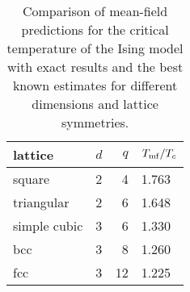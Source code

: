 \documentclass[prb,11pt]{revtex4-1}
\begin{document}
\begin{table}[h]
\centering
\begin{tabular}{|l|l|r|l|}
\hline
lattice & $d$ & $q$ & $T_{\rm mf}/T_c$ \\
\hline
square & 2 & 4 & 1.763 \\
\hline
triangular & 2 & 6 & 1.648 \\
\hline
simple cubic & 3 & 6 & 1.330 \\
\hline
bcc & 3 & 8 & 1.260 \\
\hline
fcc & 3 & 12 & 1.225 \\
\hline
\end{tabular}
\caption{\label{tab:5/tc}Comparison of mean-field predictions
for the critical temperature of the Ising model with exact results
and the best known estimates for different dimensions 
and lattice symmetries.}
\end{table}
\end{document}
